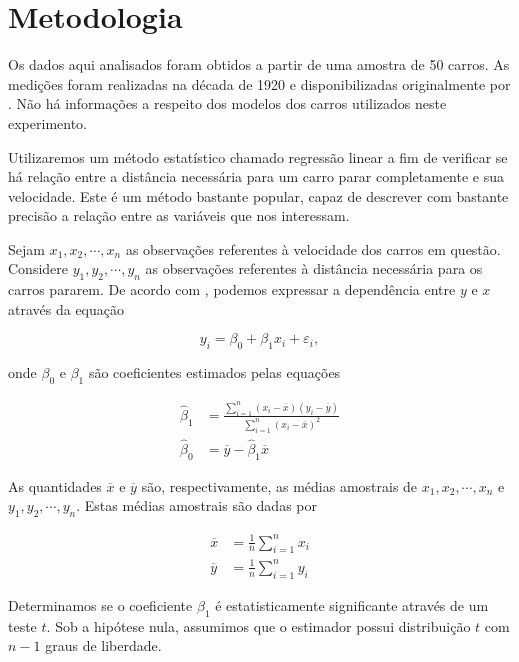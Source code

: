 \documentclass[a4paper,12pt,twoside,printwatermark=true]{modeloLEA}
\numberwithin{equation}{section}
\numberwithin{figure}{section}
\numberwithin{table}{section}
\begin{document}
\hypertarget{metodologia}{%
\section{Metodologia}\label{metodologia}}

Os dados aqui analisados foram obtidos a partir de uma amostra de 50
carros. As medições foram realizadas na década de 1920 e
disponibilizadas originalmente por \cite{Ezekiel1930}. Não há
informações a respeito dos modelos dos carros utilizados neste
experimento.

Utilizaremos um método estatístico chamado regressão linear a fim de
verificar se há relação entre a distância necessária para um carro parar
completamente e sua velocidade. Este é um método bastante popular, capaz
de descrever com bastante precisão a relação entre as variáveis que nos
interessam.

Sejam \(x_1, x_2, \cdots, x_n\) as observações referentes à velocidade
dos carros em questão. Considere \(y_1, y_2, \cdots, y_n\) as
observações referentes à distância necessária para os carros pararem. De
acordo com \cite{Kutner2004}, podemos expressar a dependência entre
\(y\) e \(x\) através da equação

\begin{equation}
y_i = \beta_0 + \beta_1x_i + \varepsilon_i,
\end{equation}

\noindent onde \(\beta_0\) e \(\beta_1\) são coeficientes estimados
pelas equações

\begin{align}
\widehat{\beta}_1 &= \frac{\sum_{i=1}^n(x_i-\overline{x})(y_i-\overline{y})}{\sum_{i=1}^n(x_i-\overline{x})^2}  \label{estimadores01} \\
\widehat{\beta}_0 &= \overline{y}-\widehat{\beta}_1\overline{x}  \label{estimadores02}
\end{align}

\noindent As quantidades \(\overline{x}\) e \(\overline{y}\) são,
respectivamente, as médias amostrais de \(x_1, x_2, \cdots, x_n\) e
\(y_1, y_2, \cdots, y_n\). Estas médias amostrais são dadas por

\begin{align}
\overline{x} &= \frac{1}{n}\sum_{i=1}^nx_i \\
\overline{y} &= \frac{1}{n}\sum_{i=1}^ny_i 
\end{align}

Determinamos se o coeficiente \(\beta_1\) é estatisticamente
significante através de um teste \(t\). Sob a hipótese nula, assumimos
que o estimador possui distribuição \(t\) com \(n-1\) graus de
liberdade.
\end{document}
